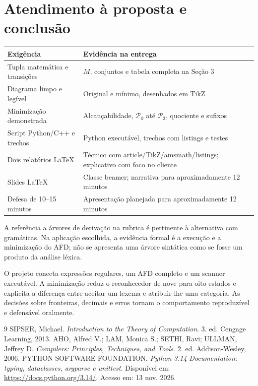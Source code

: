 \documentclass[12pt,a4paper]{article}
\begin{document}
\section{Atendimento à proposta e conclusão}
\begin{center}\small
\begin{tabular}{p{.36\linewidth}p{.54\linewidth}}
\toprule Exigência & Evidência na entrega\\\midrule
Tupla matemática e transições & $M$, conjuntos e tabela completa na Seção 3\\
Diagrama limpo e legível & Original e mínimo, desenhados em TikZ\\
Minimização demonstrada & Alcançabilidade, $\mathcal{P}_0$ até $\mathcal{P}_3$, quociente e sufixos\\
Script Python/C++ e trechos & Python executável, trechos com listings e testes\\
Dois relatórios LaTeX & Técnico com article/TikZ/amsmath/listings; explicativo com foco no cliente\\
Slides LaTeX & Classe beamer; narrativa para aproximadamente 12 minutos\\
Defesa de 10--15 minutos & Apresentação planejada para aproximadamente 12 minutos\\\bottomrule
\end{tabular}\end{center}
A referência a árvores de derivação na rubrica é pertinente à alternativa com
gramáticas. Na aplicação escolhida, a evidência formal é a execução e a
minimização do AFD; não se apresenta uma árvore sintática como se fosse um
produto da análise léxica.

O projeto conecta expressões regulares, um AFD completo e um scanner executável.
A minimização reduz o reconhecedor de nove para oito estados e explicita a
diferença entre aceitar um lexema e atribuir-lhe uma categoria. As decisões
sobre fronteiras, decimais e erros tornam o comportamento reproduzível e
defensável oralmente.

\begin{thebibliography}{9}
 SIPSER, Michael. \emph{Introduction to the Theory of Computation}.
3. ed. Cengage Learning, 2013.
 AHO, Alfred V.; LAM, Monica S.; SETHI, Ravi; ULLMAN, Jeffrey D.
\emph{Compilers: Principles, Techniques, and Tools}. 2. ed. Addison-Wesley, 2006.
 PYTHON SOFTWARE FOUNDATION.
\emph{Python 3.14 Documentation: typing, dataclasses, argparse e unittest}.
Disponível em: \url{https://docs.python.org/3.14/}. Acesso em: 13 nov. 2026.
\end{thebibliography}
\end{document}
